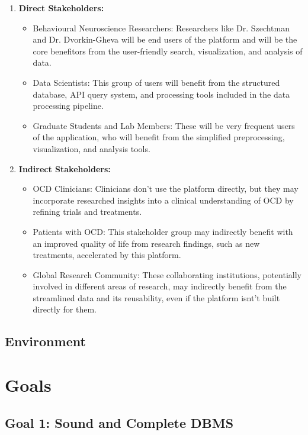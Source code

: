 \documentclass{article}
\begin{document}
\begin{enumerate}
  \item \textbf{Direct Stakeholders:}
  \begin{itemize}
    \item {Behavioural Neuroscience Researchers: Researchers like Dr. Szechtman and Dr. Dvorkin-Gheva will be 
    end users of the platform and will be the core benefitors from the user-friendly search, visualization, and analysis of data.}
    \item {Data Scientists: This group of users will benefit from the structured database, API query system, 
    and processing tools included in the data processing pipeline.}
    \item {Graduate Students and Lab Members: These will be very frequent users of the application, who will benefit from the simplified 
    preprocessing, visualization, and analysis tools.}
  \end{itemize}
  \item \textbf{Indirect Stakeholders:}
  \begin{itemize}
    \item {OCD Clinicians: Clinicians don't use the platform directly, but they may incorporate researched insights into 
    a clinical understanding of OCD by refining trials and treatments.}
    \item {Patients with OCD: This stakeholder group may indirectly benefit with an improved quality of life
     from research findings, such as new treatments, accelerated by this platform.}
    \item {Global Research Community: These collaborating institutions, potentially involved in different areas of research, 
    may indirectly benefit from the streamlined data and its reusability, even if the platform isnt't built directly for them.}
  \end{itemize}
\end{enumerate}

\subsection{Environment}


\section{Goals}

  \subsection{Goal 1: Sound and Complete DBMS} 
  
\end{document}
